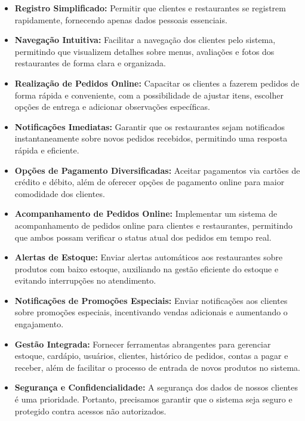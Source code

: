 \begin{itemize}
    \item \textbf{Registro Simplificado:} Permitir que clientes e restaurantes se registrem rapidamente, fornecendo apenas dados pessoais essenciais.
    
    \item \textbf{Navegação Intuitiva:} Facilitar a navegação dos clientes pelo sistema, permitindo que visualizem detalhes sobre menus, avaliações e fotos dos restaurantes de forma clara e organizada.
    
    \item \textbf{Realização de Pedidos Online:} Capacitar os clientes a fazerem pedidos de forma rápida e conveniente, com a possibilidade de ajustar itens, escolher opções de entrega e adicionar observações específicas.
    
    \item \textbf{Notificações Imediatas:} Garantir que os restaurantes sejam notificados instantaneamente sobre novos pedidos recebidos, permitindo uma resposta rápida e eficiente.
    
    \item \textbf{Opções de Pagamento Diversificadas:} Aceitar pagamentos via cartões de crédito e débito, além de oferecer opções de pagamento online para maior comodidade dos clientes.
    
    \item \textbf{Acompanhamento de Pedidos Online:} Implementar um sistema de acompanhamento de pedidos online para clientes e restaurantes, permitindo que ambos possam verificar o status atual dos pedidos em tempo real.
    
    \item \textbf{Alertas de Estoque:} Enviar alertas automáticos aos restaurantes sobre produtos com baixo estoque, auxiliando na gestão eficiente do estoque e evitando interrupções no atendimento.
    
    \item \textbf{Notificações de Promoções Especiais:} Enviar notificações aos clientes sobre promoções especiais, incentivando vendas adicionais e aumentando o engajamento.
    
    \item \textbf{Gestão Integrada:} Fornecer ferramentas abrangentes para gerenciar estoque, cardápio, usuários, clientes, histórico de pedidos, contas a pagar e receber, além de facilitar o processo de entrada de novos produtos no sistema.

    \item \textbf{Segurança e Confidencialidade:} A segurança dos dados de nossos clientes é uma prioridade. Portanto, precisamos garantir que o sistema seja seguro e protegido contra acessos não autorizados.
    
\end{itemize}

